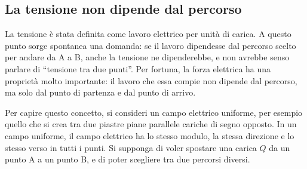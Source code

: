 \subsection{La tensione non dipende dal percorso}

La tensione è stata definita come lavoro elettrico per unità di carica. A questo punto sorge spontanea una domanda: se il lavoro dipendesse dal percorso scelto per andare da A a B, anche la tensione ne dipenderebbe, e non avrebbe senso parlare di ``tensione tra due punti''. Per fortuna, la forza elettrica ha una proprietà molto importante: il lavoro che essa compie non dipende dal percorso, ma solo dal punto di partenza e dal punto di arrivo.

Per capire questo concetto, si consideri un campo elettrico uniforme, per esempio quello che si crea tra due piastre piane parallele cariche di segno opposto. In un campo uniforme, il campo elettrico ha lo stesso modulo, la stessa direzione e lo stesso verso in tutti i punti. Si supponga di voler spostare una carica \(Q\) da un punto A a un punto B, e di poter scegliere tra due percorsi diversi.

\begin{figure}[htbp]
\centering
{}
\end{figure}

